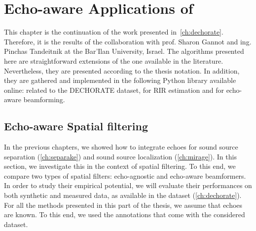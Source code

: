 \chapter{Echo-aware Applications of \dEchorate{}}\label{ch:dechorateapp}

\vspace{-2.5em}
  \synopsisChDecharateApp

\mynewline
This chapter is the continuation of the work presented in~\cref{ch:dechorate}.
Therefore, it is the results of the collaboration with prof. Sharon Gannot and ing. Pinchas Tandeitnik at the Bar'Ilan University, Israel.
The algorithms presented here are straightforward extensions of the one available in the literature.
Nevertheless, they are presented according to the thesis notation.
In addition, they are  gathered and implemented in the following Python library available online:
 related to the \ac{DECHORATE} dataset,  for \acs{RIR} estimation and  for echo-aware beamforming.

\section{Echo-aware Spatial filtering}\label{sec:dechorateapp:se}
In the previous chapters, we showed how to integrate echoes for sound source separation (\cref{ch:separake}) and sound source localization (\cref{ch:mirage}).
In this section, we investigate this in the context of spatial filtering.
To this end, we compare two types of spatial filters: echo-agnostic and echo-aware beamformers.
In order to study their empirical potential, we will evaluate their performances on both synthetic and measured data, as available in the \dEchorate{} dataset (\cref{ch:dechorate}).
For all the methods presented in this part of the thesis, we assume that echoes are known.
To this end, we used the annotations that come with the considered dataset.


